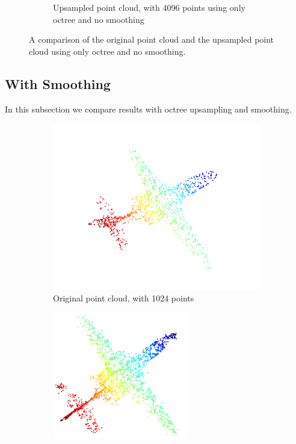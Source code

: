 \begin{figure}[h]
\begin{subfigure}{0.3\textwidth}
		\caption{Upsampled point cloud, with 4096 points using only octree and no smoothing}
	\end{subfigure}	
	\caption{A comparison of the original point cloud and the upsampled point cloud using only octree and no smoothing.}
	\label{fig:no_smoothing}
\end{figure}

\subsection{With Smoothing}

In this subsection we compare results with octree upsampling and smoothing.

\begin{figure}[h]
	\centering
	\begin{subfigure}{0.3\textwidth}
		\centering
		\includegraphics[width=\textwidth]{1024_no_upsampling.png}
		\caption{Original point cloud, with 1024 points}
	\end{subfigure}
	\begin{subfigure}{0.3\textwidth}
		\centering
		\includegraphics[width=0.65\textwidth]{./2048_octree_bilateral}

\end{subfigure}
\end{figure}
